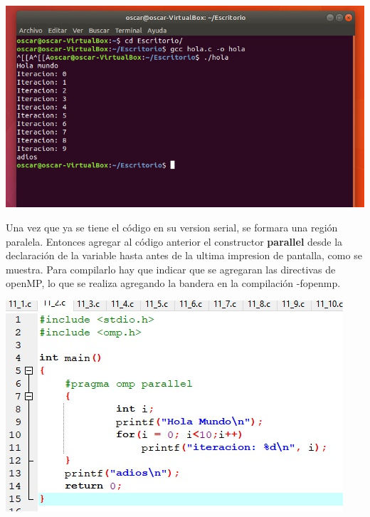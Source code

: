 \documentclass[12pt,letterpaper]{article}
\begin{document}
\begin{flushleft}
\includegraphics[scale=.8]{ejercicio01.jpg} 

\end{flushleft}

Una vez que ya se tiene el código en su version serial, se formara una región paralela. Entonces agregar al código anterior el constructor \textbf{parallel} desde la declaración de la variable hasta antes de la ultima impresion de pantalla, como se muestra.
Para compilarlo hay que indicar que se agregaran las directivas de openMP, lo que se realiza agregando la bandera en la compilación -fopenmp.

\begin{flushleft}
\includegraphics[scale=.8]{ejercicio1.jpg} 

\end{flushleft}
\end{document}
